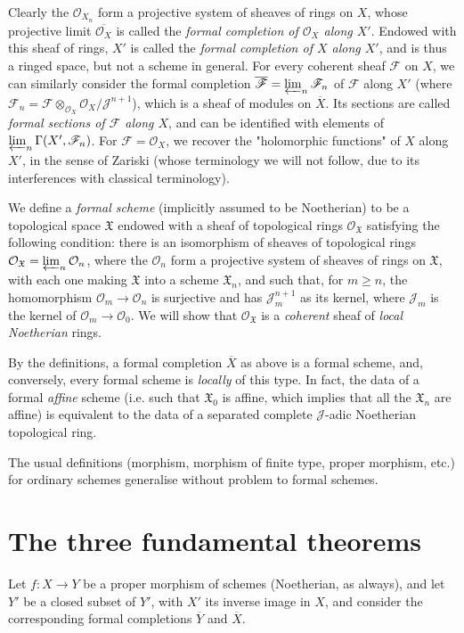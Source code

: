   Clearly the \(\mathcal {O}_{X_n}\) form a projective system of sheaves of rings on \(X\), whose projective limit \(\overline {\mathcal {O}_X}\) is called the \emph{formal completion of \(\mathcal {O}_X\) along \(X'\)}.
  Endowed with this sheaf of rings, \(X'\) is called the \emph{formal completion of \(X\) along \(X'\)}, and is thus a ringed space, but not a scheme in general.
  For every coherent sheaf \(\mathscr {F}\) on \(X\), we can similarly consider the formal completion \(\overline {\mathscr {F}}=\varprojlim _n\mathscr {F}_n\) of \(\mathscr {F}\) along \(X'\) (where \(\mathscr {F}_n=\mathscr {F}\otimes _{\mathcal {O}_X}\mathcal {O}_X/\mathscr {J}^{n+1}\)), which is a sheaf of modules on \(\overline {X}\).
  Its sections are called \emph{formal sections of \(\mathscr {F}\) along \(X\)}, and can be identified with elements of \(\varprojlim _n\Gamma (X',\mathscr {F}_n)\).
  For \(\mathscr {F}=\mathcal {O}_X\), we recover the "holomorphic functions" of \(X\) along \(X'\), in the sense of Zariski (whose terminology we will not follow, due to its interferences with classical terminology).\par{}We define a \emph{formal scheme} (implicitly assumed to be Noetherian) to be a topological space \(\mathfrak {X}\) endowed with a sheaf of topological rings \(\mathcal {O}_{\mathfrak {X}}\) satisfying the following condition:
  there is an isomorphism of sheaves of topological rings \(\mathcal {O}_{\mathfrak {X}}=\varprojlim _n\mathcal {O}_n\), where the \(\mathcal {O}_n\) form a projective system of sheaves of rings on \(\mathfrak {X}\), with each one making \(\mathfrak {X}\) into a scheme \(\mathfrak {X}_n\), and such that, for \(m\geqslant  n\), the homomorphism \(\mathcal {O}_m\to \mathcal {O}_n\) is surjective and has \(\mathscr {J}_m^{n+1}\) as its kernel, where \(\mathscr {J}_m\) is the kernel of \(\mathcal {O}_m\to \mathcal {O}_0\).
  We will show that \(\mathcal {O}_{\mathfrak {X}}\) is a \emph{coherent} sheaf of \emph{local Noetherian} rings.\par{}By the definitions, a formal completion \(\overline {X}\) as above is a formal scheme, and, conversely, every formal scheme is \emph{locally} of this type.
  In fact, the data of a formal \emph{affine} scheme (i.e. such that \(\mathfrak {X}_0\) is affine, which implies that all the \(\mathfrak {X}_n\) are affine) is equivalent to the data of a separated complete \(\mathscr {J}\)-adic Noetherian topological ring.\par{}The usual definitions (morphism, morphism of finite type, proper morphism, etc.) for ordinary schemes generalise without problem to formal schemes.\chapter{The three fundamental theorems}\thispagestyle{fancy}\label{fga2-3}\par{}Let \(f\colon  X\to  Y\) be a proper morphism of schemes (Noetherian, as always), and let \(Y'\) be a closed subset of \(Y'\), with \(X'\) its inverse image in \(X\), and consider the corresponding formal completions \(\overline {Y}\) and \(\overline {X}\).
